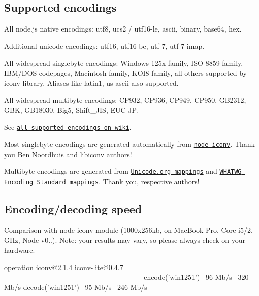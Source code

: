 \subsection*{Supported encodings}


\begin{DoxyItemize}
\item All node.\+js native encodings\+: utf8, ucs2 / utf16-\/le, ascii, binary, base64, hex.
\item Additional unicode encodings\+: utf16, utf16-\/be, utf-\/7, utf-\/7-\/imap.
\item All widespread singlebyte encodings\+: Windows 125x family, I\+S\+O-\/8859 family, I\+B\+M/\+D\+OS codepages, Macintosh family, K\+O\+I8 family, all others supported by iconv library. Aliases like \textquotesingle{}latin1\textquotesingle{}, \textquotesingle{}us-\/ascii\textquotesingle{} also supported.
\item All widespread multibyte encodings\+: C\+P932, C\+P936, C\+P949, C\+P950, G\+B2312, G\+BK, G\+B18030, Big5, Shift\+\_\+\+J\+IS, E\+U\+C-\/\+JP.
\end{DoxyItemize}

See \href{https://github.com/ashtuchkin/iconv-lite/wiki/Supported-Encodings}{\tt all supported encodings on wiki}.

Most singlebyte encodings are generated automatically from \href{https://github.com/bnoordhuis/node-iconv}{\tt node-\/iconv}. Thank you Ben Noordhuis and libiconv authors!

Multibyte encodings are generated from \href{http://www.unicode.org/Public/MAPPINGS/}{\tt Unicode.\+org mappings} and \href{http://encoding.spec.whatwg.org/}{\tt W\+H\+A\+T\+WG Encoding Standard mappings}. Thank you, respective authors!

\subsection*{Encoding/decoding speed}

Comparison with node-\/iconv module (1000x256kb, on Mac\+Book Pro, Core i5/2. G\+Hz, Node v0..). Note\+: your results may vary, so please always check on your hardware. \begin{DoxyVerb}operation             iconv@2.1.4   iconv-lite@0.4.7
----------------------------------------------------------
encode('win1251')     ~96 Mb/s      ~320 Mb/s
decode('win1251')     ~95 Mb/s      ~246 Mb/s
\end{DoxyVerb}



